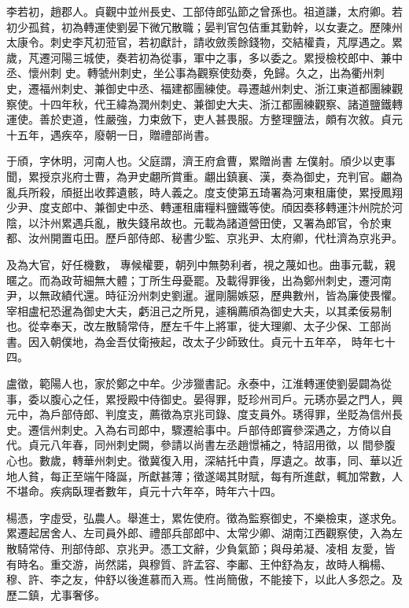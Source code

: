 \begin{pinyinscope}
 李若初，趙郡人。貞觀中並州長史、工部侍郎弘節之曾孫也。祖道謙，太府卿。若初少孤貧，初為轉運使劉晏下微冗散職；晏判官包佶重其勤幹，以女妻之。歷陳州太康令。刺史李芃初蒞官，若初獻計，請收斂羨餘錢物，交結權貴，芃厚遇之。累歲，芃遷河陽三城使，奏若初為從事，軍中之事，多以委之。累授檢校郎中、兼中丞、懷州刺
 史。轉虢州刺史，坐公事為觀察使劾奏，免歸。久之，出為衢州刺史，遷福州刺史、兼御史中丞、福建都團練使。尋遷越州刺史、浙江東道都團練觀察使。十四年秋，代王緯為潤州刺史、兼御史大夫、浙江都團練觀察、諸道鹽鐵轉運使。善於吏道，性嚴強，力束斂下，吏人甚畏服。方整理鹽法，頗有次敘。貞元十五年，遇疾卒，廢朝一日，贈禮部尚書。



 于頎，字休明，河南人也。父庭謂，濟王府倉曹，累贈尚書
 左僕射。頎少以吏事聞，累授京兆府士曹，為尹史翽所賞重。翽出鎮襄、漢，奏為御史，充判官。翽為亂兵所殺，頎挺出收葬遺骸，時人義之。度支使第五琦署為河東租庸使，累授鳳翔少尹、度支郎中、兼御史中丞、轉運租庸糧料鹽鐵等使。頎因奏移轉運汴州院於河陰，以汴州累遇兵亂，散失錢帛故也。元載為諸道營田使，又署為郎官，令於東都、汝州開置屯田。歷戶部侍郎、秘書少監、京兆尹、太府卿，代杜濟為京兆尹。



 及為大官，好任機數，
 專候權要，朝列中無勢利者，視之蔑如也。曲事元載，親暱之。而為政苛細無大體；丁所生母憂罷。及載得罪後，出為鄭州刺史，遷河南尹，以無政績代還。時征汾州刺史劉暹。暹剛腸嫉惡，歷典數州，皆為廉使畏懼。宰相盧杞恐暹為御史大夫，虧沮己之所見，遽稱薦頎為御史大夫，以其柔佞易制也。從幸奉天，改左散騎常侍，歷左千牛上將軍，徙大理卿、太子少保、工部尚書。因入朝僕地，為金吾仗衛掖起，改太子少師致仕。貞元十五年卒，
 時年七十四。



 盧徵，範陽人也，家於鄭之中牟。少涉獵書記。永泰中，江淮轉運使劉晏闢為從事，委以腹心之任，累授殿中侍御史。晏得罪，貶珍州司戶。元琇亦晏之門人，興元中，為戶部侍郎、判度支，薦徵為京兆司錄、度支員外。琇得罪，坐貶為信州長史。遷信州刺史。入為右司郎中，驟遷給事中。戶部侍郎竇參深遇之，方倚以自代。貞元八年春，同州刺史闕，參請以尚書左丞趙憬補之，特詔用徵，以
 間參腹心也。數歲，轉華州刺史。徵冀復入用，深結托中貴，厚遺之。故事，同、華以近地人貧，每正至端午降誕，所獻甚薄；徵遂竭其財賦，每有所進獻，輒加常數，人不堪命。疾病臥理者數年，貞元十六年卒，時年六十四。



 楊憑，字虛受，弘農人。舉進士，累佐使府。徵為監察御史，不樂檢束，遂求免。累遷起居舍人、左司員外郎、禮部兵部郎中、太常少卿、湖南江西觀察使，入為左散騎常侍、刑部侍郎、京兆尹。憑工文辭，少負氣節；與母弟凝、凌相
 友愛，皆有時名。重交游，尚然諾，與穆質、許孟容、李鄘、王仲舒為友，故時人稱楊、穆、許、李之友，仲舒以後進慕而入焉。性尚簡傲，不能接下，以此人多怨之。及歷二鎮，尤事奢侈。




\end{pinyinscope}
